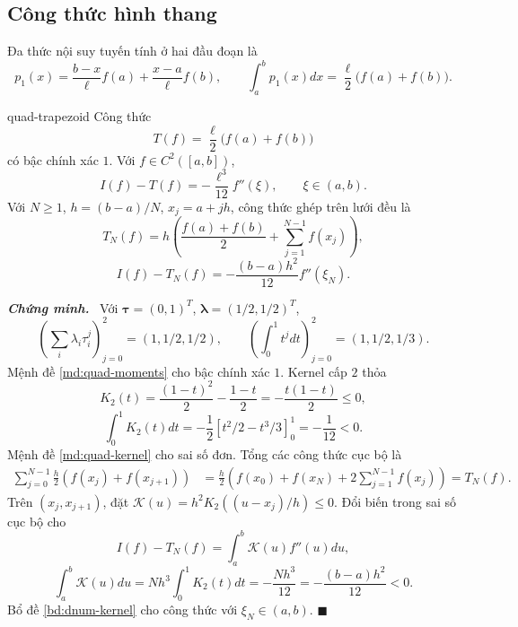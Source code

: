\documentclass[12pt,a4paper,oneside]{book}
\numberwithin{algorithm}{chapter}
\theoremstyle{definition}
\newenvironment{chungminh}{\par\medskip\noindent\textbf{\textit{\color{mainblue}Chứng minh.}}\ }{\hfill$\blacksquare$\par\medskip}
\begin{document}
\subsection{Công thức hình thang}
Đa thức nội suy tuyến tính ở hai đầu đoạn là
\[
 p_1(x)=\frac{b-x}{\ell}f(a)+\frac{x-a}{\ell}f(b),\qquad
 \int_a^b p_1(x)dx=\frac\ell2\bigl(f(a)+f(b)\bigr).
\]
\begin{dinhly}{}{quad-trapezoid}
Công thức
\[
 T(f)=\frac\ell2\bigl(f(a)+f(b)\bigr)
\]
có bậc chính xác $1$. Với $f\in C^2([a,b])$,
\[
 I(f)-T(f)=-\frac{\ell^3}{12}f''(\xi),\qquad\xi\in(a,b).
\]
Với $N\geq1$, $h=(b-a)/N$, $x_j=a+jh$, công thức ghép trên lưới đều là
\begin{equation}\label{eq:quad-trapezoid-composite}
 T_N(f)=h\left(\frac{f(a)+f(b)}2+\sum_{j=1}^{N-1}f(x_j)\right),
\end{equation}
\[
 I(f)-T_N(f)=-\frac{(b-a)h^2}{12}f''(\xi_N).
\]
\end{dinhly}
\begin{chungminh}
Với $\boldsymbol\tau=(0,1)^T$, $\boldsymbol\lambda=(1/2,1/2)^T$,
\[
 \left(\sum_i\lambda_i\tau_i^j\right)_{j=0}^2=(1,1/2,1/2),\qquad
 \left(\int_0^1t^jdt\right)_{j=0}^2=(1,1/2,1/3).
\]
Mệnh đề \ref{md:quad-moments} cho bậc chính xác $1$. Kernel cấp $2$ thỏa
\[
 K_2(t)=\frac{(1-t)^2}{2}-\frac{1-t}{2}=-\frac{t(1-t)}2\leq0,
\]
\[
 \int_0^1K_2(t)dt=-\frac12[t^2/2-t^3/3]_0^1=-\frac1{12}<0.
\]
Mệnh đề \ref{md:quad-kernel} cho sai số đơn. Tổng các công thức cục bộ là
\begin{align*}
 \sum_{j=0}^{N-1}\frac h2(f(x_j)+f(x_{j+1}))
 &=\frac h2\left(f(x_0)+f(x_N)+2\sum_{j=1}^{N-1}f(x_j)\right)=T_N(f).
\end{align*}
Trên $(x_j,x_{j+1})$, đặt $\mathcal K(u)=h^2K_2((u-x_j)/h)\leq0$. Đổi biến trong sai số cục bộ cho
\[
 I(f)-T_N(f)=\int_a^b\mathcal K(u)f''(u)du,
\]
\[
 \int_a^b\mathcal K(u)du=Nh^3\int_0^1K_2(t)dt
 =-\frac{Nh^3}{12}=-\frac{(b-a)h^2}{12}<0.
\]
Bổ đề \ref{bd:dnum-kernel} cho công thức với $\xi_N\in(a,b)$.
\end{chungminh}

\end{document}

